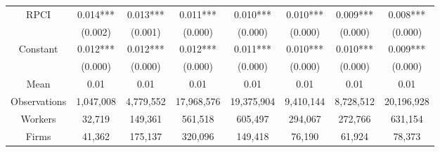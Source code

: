 \begin{tabular}{cccccccc}
\midrule
RPCI  & 0.014*** & 0.013*** & 0.011*** & 0.010*** & 0.010*** & 0.009*** & 0.008*** \\
      & (0.002) & (0.001) & (0.000) & (0.000) & (0.000) & (0.000) & (0.000) \\
Constant & 0.012*** & 0.012*** & 0.012*** & 0.011*** & 0.010*** & 0.010*** & 0.009*** \\
      & (0.000) & (0.000) & (0.000) & (0.000) & (0.000) & (0.000) & (0.000) \\
Mean  & 0.01  & 0.01  & 0.01  & 0.01  & 0.01  & 0.01  & 0.01 \\
\midrule
Observations & 1,047,008 & 4,779,552 & 17,968,576 & 19,375,904 & 9,410,144 & 8,728,512 & 20,196,928 \\
Workers & 32,719 & 149,361 & 561,518 & 605,497 & 294,067 & 272,766 & 631,154 \\
Firms & 41,362 & 175,137 & 320,096 & 149,418 & 76,190 & 61,924 & 78,373 \\
\bottomrule
\bottomrule
\end{tabular}%
